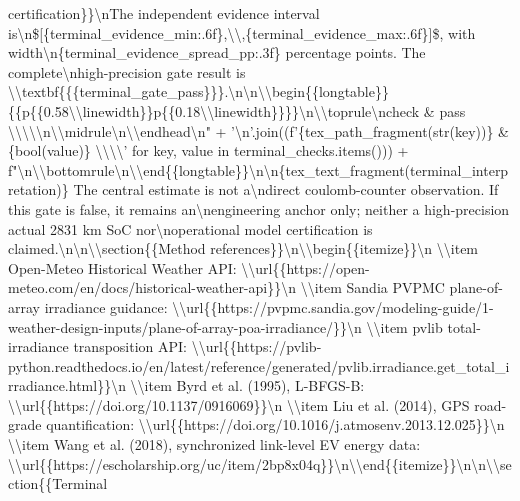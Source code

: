 \documentclass[a4paper,11pt]{article}
\begin{document}
\begin{enumerate}[leftmargin=1.8em]
certification\}\}\textbackslash{}nThe independent evidence interval is\textbackslash{}n\$[\{terminal\_evidence\_min:.6f\},\textbackslash{}\textbackslash{},\{terminal\_evidence\_max:.6f\}]\$, with width\textbackslash{}n\{terminal\_evidence\_spread\_pp:.3f\} percentage points. The complete\textbackslash{}nhigh-precision gate result is \textbackslash{}\textbackslash{}textbf\{\{\{terminal\_gate\_pass\}\}\}.\textbackslash{}n\textbackslash{}n\textbackslash{}\textbackslash{}begin\{\{longtable\}\}\{\{p\{\{0.58\textbackslash{}\textbackslash{}linewidth\}\}p\{\{0.18\textbackslash{}\textbackslash{}linewidth\}\}\}\}\textbackslash{}n\textbackslash{}\textbackslash{}toprule\textbackslash{}ncheck \& pass \textbackslash{}\textbackslash{}\textbackslash{}\textbackslash{}\textbackslash{}n\textbackslash{}\textbackslash{}midrule\textbackslash{}n\textbackslash{}\textbackslash{}endhead\textbackslash{}n" + '\textbackslash{}n'.join((f'\{tex\_path\_fragment(str(key))\} \& \{bool(value)\} \textbackslash{}\textbackslash{}\textbackslash{}\textbackslash{}' for key, value in terminal\_checks.items())) + f"\textbackslash{}n\textbackslash{}\textbackslash{}bottomrule\textbackslash{}n\textbackslash{}\textbackslash{}end\{\{longtable\}\}\textbackslash{}n\textbackslash{}n\{tex\_text\_fragment(terminal\_interpretation)\} The central estimate is not a\textbackslash{}ndirect coulomb-counter observation. If this gate is false, it remains an\textbackslash{}nengineering anchor only; neither a high-precision actual 2831 km SoC nor\textbackslash{}noperational model certification is claimed.\textbackslash{}n\textbackslash{}n\textbackslash{}\textbackslash{}section\{\{Method references\}\}\textbackslash{}n\textbackslash{}\textbackslash{}begin\{\{itemize\}\}\textbackslash{}n  \textbackslash{}\textbackslash{}item Open-Meteo Historical Weather API: \textbackslash{}\textbackslash{}url\{\{https://open-meteo.com/en/docs/historical-weather-api\}\}\textbackslash{}n  \textbackslash{}\textbackslash{}item Sandia PVPMC plane-of-array irradiance guidance: \textbackslash{}\textbackslash{}url\{\{https://pvpmc.sandia.gov/modeling-guide/1-weather-design-inputs/plane-of-array-poa-irradiance/\}\}\textbackslash{}n  \textbackslash{}\textbackslash{}item pvlib total-irradiance transposition API: \textbackslash{}\textbackslash{}url\{\{https://pvlib-python.readthedocs.io/en/latest/reference/generated/pvlib.irradiance.get\_total\_irradiance.html\}\}\textbackslash{}n  \textbackslash{}\textbackslash{}item Byrd et al. (1995), L-BFGS-B: \textbackslash{}\textbackslash{}url\{\{https://doi.org/10.1137/0916069\}\}\textbackslash{}n  \textbackslash{}\textbackslash{}item Liu et al. (2014), GPS road-grade quantification: \textbackslash{}\textbackslash{}url\{\{https://doi.org/10.1016/j.atmosenv.2013.12.025\}\}\textbackslash{}n  \textbackslash{}\textbackslash{}item Wang et al. (2018), synchronized link-level EV energy data: \textbackslash{}\textbackslash{}url\{\{https://escholarship.org/uc/item/2bp8x04q\}\}\textbackslash{}n\textbackslash{}\textbackslash{}end\{\{itemize\}\}\textbackslash{}n\textbackslash{}n\textbackslash{}\textbackslash{}section\{\{Terminal 
\end{enumerate}
\end{document}
